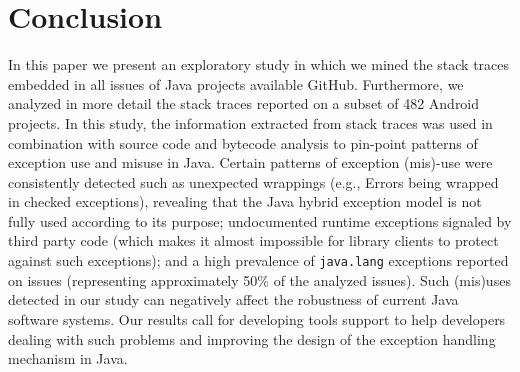 \documentclass[conference]{IEEEtran}
\begin{document}

\enlargethispage{-2\baselineskip}

\section{Conclusion}

In this paper we present an exploratory study in which we mined the stack 
traces embedded in all issues of Java projects available GitHub.
Furthermore, we analyzed in more detail the
stack traces reported on a subset of 482 Android projects. In this study, the information extracted 
from stack traces was used in combination with source code and bytecode analysis to 
pin-point patterns of exception use and misuse in Java.
Certain patterns of exception
(mis)-use were consistently detected such as unexpected wrappings (e.g., Errors
being wrapped in checked exceptions), revealing that  the Java hybrid exception
model is not fully used according to its purpose; undocumented runtime
exceptions signaled by third party code (which makes it almost impossible for
library clients to protect against such exceptions); 
and a high prevalence of
\texttt{java.lang} exceptions reported on issues (representing approximately 50\% of the
analyzed issues). Such (mis)uses detected in our study can negatively affect the 
robustness of current Java software systems. Our results call for  
 developing tools support to help developers dealing with such problems and 
improving the design of the exception handling mechanism in Java.
\end{document}
